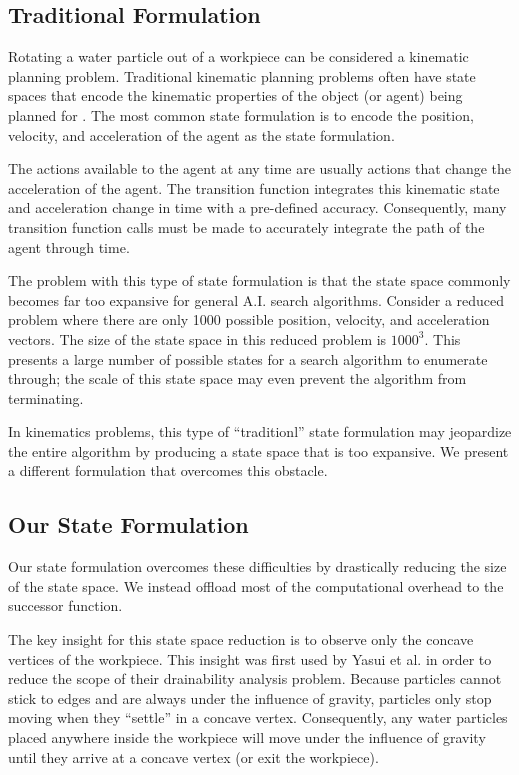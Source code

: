 	\subsection{Traditional Formulation}

Rotating a water particle out of a workpiece can be considered a kinematic planning problem. Traditional kinematic planning problems often have state spaces that encode the kinematic properties of the object (or agent) being planned for \cite{PlanningBook} \cite{KinematicsBook}. The most common state formulation is to encode the position, velocity, and acceleration of the agent as the state formulation.

The actions available to the agent at any time are usually actions that change the acceleration of the agent. The transition function integrates this kinematic state and acceleration change in time with a pre-defined accuracy. Consequently, many transition function calls must be made to accurately integrate the path of the agent through time.

The problem with this type of state formulation is that the state space commonly becomes far too expansive for general A.I. search algorithms. Consider a reduced problem where there are only 1000 possible position, velocity, and acceleration vectors. The size of the state space in this reduced problem is $1000^3$. This presents a large number of possible states for a search algorithm to enumerate through; the scale of this state space may even prevent the algorithm from terminating.

In kinematics problems, this type of ``traditionl'' state formulation may jeopardize the entire algorithm by producing a state space that is too expansive. We present a different formulation that overcomes this obstacle.

	\subsection{Our State Formulation}

Our state formulation overcomes these difficulties by drastically reducing the size of the state space. We instead offload most of the computational overhead to the successor function.

The key insight for this state space reduction is to observe only the concave vertices of the workpiece. This insight was first used by Yasui et al. \cite{Yasui2011} in order to reduce the scope of their drainability analysis problem. Because particles cannot stick to edges and are always under the influence of gravity, particles only stop moving when they ``settle'' in a concave vertex. Consequently, any water particles placed anywhere inside the workpiece will move under the influence of gravity until they arrive at a concave vertex (or exit the workpiece).

